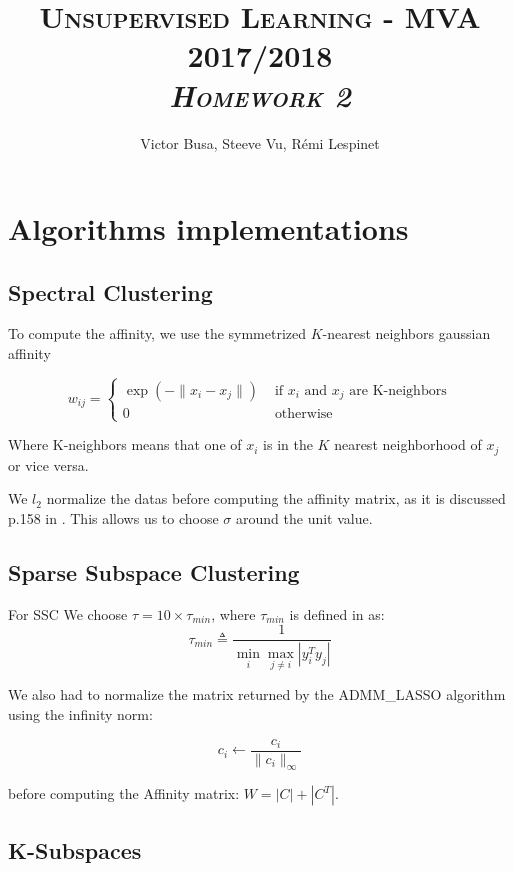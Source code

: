 \documentclass[a4paper, 11pt]{article}
\title{\textsc{Unsupervised Learning - MVA 2017/2018 \\ \emph{Homework 2}} }
\author{Victor Busa, Steeve Vu, Rémi Lespinet}
\date{}
\newcommand{\norm}[1]{\|{#1}\|}
\begin{document}
\maketitle
\thispagestyle{fancy}

\section{Algorithms implementations}

\subsection{Spectral Clustering}

To compute the affinity, we use the symmetrized $K$-nearest neighbors
gaussian affinity

\begin{equation*}
  w_{ij} = \left\{
    \begin{array}{ll}
      \exp{(-\norm{x_i - x_j})} & \text{ if $x_i$ and $x_j$ are K-neighbors} \\
      0 & \text{ otherwise }
    \end{array}
  \right.
\end{equation*}

Where K-neighbors means that one of $x_i$ is in the $K$ nearest
neighborhood of $x_j$ or vice versa.

We $l_2$ normalize the datas before computing the affinity
matrix, as it is discussed p.158 in \cite{vidal16}. This allows us
to choose $\sigma$ around the unit value.

\subsection{Sparse Subspace Clustering} \label{ss:ssc}

For SSC We choose $\tau = 10 \times \tau_{min}$, where $\tau_{min}$ is defined in \cite{elhamifar09} as:
$$\tau_{min} \triangleq \dfrac{1}{\min\limits_{i} \max\limits_{j \neq i} |y_i^T y_j |}$$

We also had to normalize the matrix returned by the ADMM\_LASSO algorithm using the infinity norm:

$$c_i \leftarrow \dfrac{c_i}{\norm{c_i}_{\infty}}$$

before computing the Affinity matrix: $W = |C| + |C^T|$.

\subsection{K-Subspaces}
\end{document}
